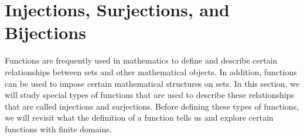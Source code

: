 \section{Injections, Surjections, and Bijections} \label{S:typesoffunctions}
\setcounter{previewactivity}{0}
%
Functions are frequently used in mathematics to define and describe certain relationships between sets and other mathematical objects.  In addition, functions can be used to impose certain mathematical structures on sets.  In this section, we will study special types of functions that are used to describe these relationships that are called injections and surjections.  Before defining these types of functions, we will revisit what the definition of a function tells us and explore certain functions with finite domains.










